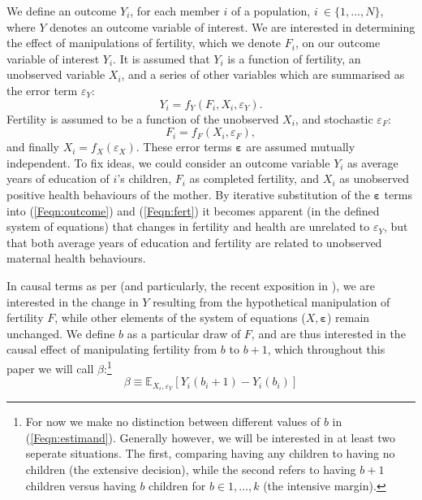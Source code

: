 We define an outcome $Y_i$, for each member $i$ of a population, $i\ \in \{1,
\ldots,N\}$, where $Y$ denotes an outcome variable of interest. We are 
interested in determining the effect of manipulations of fertility, which we
denote $F_i$, on our outcome variable of interest $Y_i$.  It is assumed that 
$Y_i$ is a function of fertility, an unobserved variable $X_i$, and a series of 
other variables which are summarised as the error term $\varepsilon_Y$:
\begin{equation}
\label{Feqn:outcome}
Y_i=f_Y(F_i,X_i,\varepsilon_Y).
\end{equation}
Fertility is assumed to be a function of the unobserved $X_i$, and stochastic 
$\varepsilon_F$:
\begin{equation}
\label{Feqn:fert}
F_i=f_F(X_i,\varepsilon_F),
\end{equation}
and finally $X_i=f_X(\varepsilon_X)$. These error terms $\bm\varepsilon$ are 
assumed mutually independent. To fix ideas, we could consider an outcome variable 
$Y_i$ as average years of education of $i$'s children, $F_i$ as completed 
fertility, and $X_i$ as unobserved positive health behaviours of the mother. By 
iterative substitution of the $\bm\varepsilon$ terms into (\ref{Feqn:outcome}) 
and (\ref{Feqn:fert}) it becomes apparent (in the defined system of equations) 
that changes in fertility and health are unrelated to $\varepsilon_Y$, but that 
both average years of education and fertility are related to unobserved maternal 
health behaviours.

In causal terms as per \citet{Haavelmo1943,Haavelmo1944} (and particularly, the
recent exposition in \citet{HeckmanPinto2015}), we are interested in the change
in $Y$ resulting from the hypothetical manipulation of fertility $F$, while 
other elements of the system of equations ($X,\bm\varepsilon$) remain unchanged.  
We define $b$ as a particular draw of $F$, and are thus interested in the causal 
effect of manipulating fertility from $b$ to $b+1$, which throughout this paper
we will call $\beta$:\footnote{For now we make no distinction between different 
values of $b$ in (\ref{Feqn:estimand}).  Generally however, we will be interested 
in at least two seperate situations. The first, comparing having any children 
to having no children (the extensive decision), while the second refers to 
having $b+1$ children versus having $b$ children for $b\in{1,\ldots,k}$ (the 
intensive margin).}
\begin{equation}
\label{Feqn:estimand}
\beta\equiv\mathbb{E}_{X_i,\varepsilon_Y}[Y_i(b_i+1)-Y_i(b_i)]
\end{equation}

